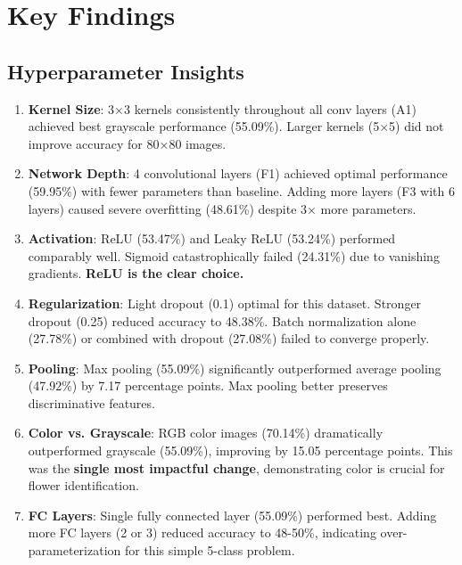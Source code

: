 \documentclass[12pt,a4paper]{article}
\begin{document}
\section{Key Findings}

\subsection{Hyperparameter Insights}
\begin{enumerate}
    \item \textbf{Kernel Size}: 3×3 kernels consistently throughout all conv layers (A1) achieved best grayscale performance (55.09\%). Larger kernels (5×5) did not improve accuracy for 80×80 images.
    
    \item \textbf{Network Depth}: 4 convolutional layers (F1) achieved optimal performance (59.95\%) with fewer parameters than baseline. Adding more layers (F3 with 6 layers) caused severe overfitting (48.61\%) despite 3× more parameters.
    
    \item \textbf{Activation}: ReLU (53.47\%) and Leaky ReLU (53.24\%) performed comparably well. Sigmoid catastrophically failed (24.31\%) due to vanishing gradients. \textbf{ReLU is the clear choice.}
    
    \item \textbf{Regularization}: Light dropout (0.1) optimal for this dataset. Stronger dropout (0.25) reduced accuracy to 48.38\%. Batch normalization alone (27.78\%) or combined with dropout (27.08\%) failed to converge properly.
    
    \item \textbf{Pooling}: Max pooling (55.09\%) significantly outperformed average pooling (47.92\%) by 7.17 percentage points. Max pooling better preserves discriminative features.
    
    \item \textbf{Color vs. Grayscale}: RGB color images (70.14\%) dramatically outperformed grayscale (55.09\%), improving by 15.05 percentage points. This was the \textbf{single most impactful change}, demonstrating color is crucial for flower identification.
    
    \item \textbf{FC Layers}: Single fully connected layer (55.09\%) performed best. Adding more FC layers (2 or 3) reduced accuracy to 48-50\%, indicating over-parameterization for this simple 5-class problem.
\end{enumerate}
\end{document}
